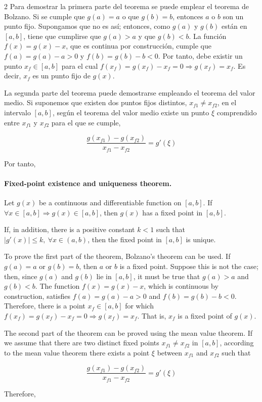 \begin{paracol}{2}
Para demostrar la primera parte del teorema se puede emplear el teorema de Bolzano. Si se cumple que $g(a)=a$ o que $g(b)=b$, entonces $a$ o $b$ son un punto fijo. Supongamos que no es así; entonces, como $g(a)$ y $g(b)$ están en $[a,b]$, tiene que cumplirse que $g(a)>a$ y que $g(b)<b$. La función $f(x)=g(x)-x$, que es continua por construcción, cumple que $f(a)=g(a)-a>0$ y $f(b)=g(b)-b<0$. Por tanto, debe existir un punto $x_f \in [a, b]$ para el cual $f(x_f)=g(x_f)-x_f=0 \Rightarrow g(x_f)=x_f$. Es decir, $x_f$ es un punto fijo de $g(x)$.

La segunda parte del teorema puede demostrarse empleando el teorema del valor medio. Si suponemos que existen dos puntos fijos distintos, $x_{f1} \neq x_{f2}$, en el intervalo $[a,b]$, según el teorema del valor medio existe un punto $\xi$ comprendido entre $x_{f1}$ y $ x_{f2}$ para el que se cumple,

\begin{equation*}
\frac{g(x_{f1})-g(x_{f2})}{x_{f1}-x_{f2}}=g'(\xi)
\end{equation*}

Por tanto,
\switchcolumn

\paragraph{Fixed-point existence and uniqueness theorem.} Let $g(x)$ be a continuous and differentiable function on $[a, b]$. If $\forall x \in [a, b] \Rightarrow g(x)\in [a,b]$, then $g(x)$ has a fixed point in $[a, b]$.

If, in addition, there is a positive constant $k < 1$ such that $\vert g'(x) \vert \leq k, \  \forall x \in (a, b)$, then the fixed point in $[a,b]$ is unique.

To prove the first part of the theorem, Bolzano's theorem can be used. If $g(a)=a$ or $g(b)=b$, then $a$ or $b$ is a fixed point. Suppose this is not the case; then, since $g(a)$ and $g(b)$ lie in $[a,b]$, it must be true that $g(a)>a$ and $g(b)<b$. The function $f(x)=g(x)-x$, which is continuous by construction, satisfies $f(a)=g(a)-a>0$ and $f(b)=g(b)-b<0$. Therefore, there is a point $x_f \in [a, b]$ for which $f(x_f)=g(x_f)-x_f=0 \Rightarrow g(x_f)=x_f$. That is, $x_f$ is a fixed point of $g(x)$.

The second part of the theorem can be proved using the mean value theorem. If we assume that there are two distinct fixed points $x_{f1} \neq x_{f2}$ in $[a,b]$, according to the mean value theorem there exists a point $\xi$ between $x_{f1}$ and $x_{f2}$ such that

\begin{equation*}
\frac{g(x_{f1})-g(x_{f2})}{x_{f1}-x_{f2}}=g'(\xi)
\end{equation*}

Therefore,
\end{paracol}


